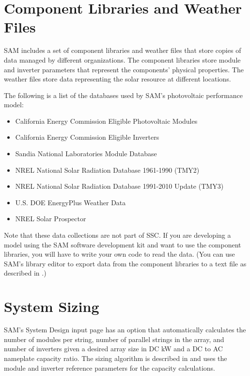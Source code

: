 \documentclass[12pt,letterpaper]{article}
\begin{document}
\section{Component Libraries and Weather Files} \label{sec-libraries}

SAM includes a set of component libraries and weather files that store copies of data managed by different organizations. The component libraries store module and inverter parameters that represent the components' physical properties. The weather files store data representing the solar resource at different locations.

The following is a list of the databases used by SAM's photovoltaic performance model:
\begin{itemize}
\item California Energy Commission Eligible Photovoltaic Modules \citep{gsc2014b}
\item California Energy Commission Eligible Inverters \citep{gsc2014c}
\item Sandia National Laboratories Module Database \citep{sandia-testeval}
\item NREL National Solar Radiation Database 1961-1990 (TMY2) \citep{nsrdb}
\item NREL National Solar Radiation Database 1991-2010 Update (TMY3) \citep{nsrdb}
\item U.S. DOE EnergyPlus Weather Data \citep{epw}
\item NREL Solar Prospector \citep{solarprospector}
\end{itemize}

Note that these data collections are not part of SSC. If you are developing a model using the SAM software development kit and want to use the component libraries, you will have to write your own code to read the data. (You can use SAM's library editor to export data from the component libraries to a text file as described in \citet{help-libraries}.)

\section{System Sizing} \label{sec-sizing}

SAM's System Design input page has an option that automatically calculates the number of modules per string, number of parallel strings in the array, and number of inverters given a desired array size in DC kW and a DC to AC nameplate capacity ratio. The sizing algorithm is described in \citet{help-sizing} and uses the module and inverter reference parameters for the capacity calculations.
\end{document}
